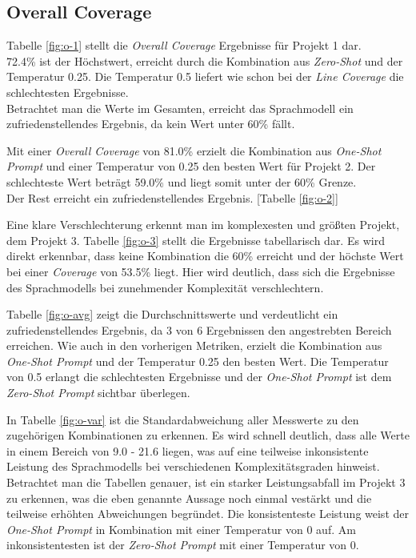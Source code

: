 \subsection{Overall Coverage}
Tabelle \ref{fig:o-1} stellt die \textit{Overall Coverage} Ergebnisse für Projekt 1 dar. \\72.4\% ist der Höchstwert, erreicht durch die Kombination aus \textit{Zero-Shot} und der Temperatur 0.25. Die Temperatur 0.5 liefert wie schon bei der \textit{Line Coverage}  die schlechtesten Ergebnisse.\\ Betrachtet man die Werte im Gesamten, erreicht das Sprachmodell ein zufriedenstellendes Ergebnis, da kein Wert unter 60\% fällt.

Mit einer \textit{Overall Coverage}  von 81.0\% erzielt die Kombination aus \textit{One-Shot Prompt} und einer Temperatur von 0.25 den besten Wert für Projekt 2. Der schlechteste Wert beträgt 59.0\% und liegt somit unter der 60\% Grenze.\\ Der Rest erreicht ein zufriedenstellendes Ergebnis. [Tabelle \ref{fig:o-2}]

Eine klare Verschlechterung erkennt man im komplexesten und größten Projekt, dem Projekt 3. Tabelle \ref{fig:o-3} stellt die Ergebnisse tabellarisch dar. Es wird direkt erkennbar, dass keine Kombination die 60\% erreicht und der höchste Wert bei einer \textit{Coverage} von 53.5\% liegt. Hier wird deutlich, dass sich die Ergebnisse des Sprachmodells bei zunehmender Komplexität verschlechtern.

Tabelle \ref{fig:o-avg} zeigt die Durchschnittswerte und verdeutlicht ein zufriedenstellendes Ergebnis, da 3 von 6 Ergebnissen den angestrebten Bereich erreichen. Wie auch in den vorherigen Metriken, erzielt die Kombination aus \textit{One-Shot Prompt} und der Temperatur 0.25 den besten Wert. Die Temperatur von 0.5 erlangt die schlechtesten Ergebnisse und der \textit{One-Shot Prompt} ist dem \textit{Zero-Shot Prompt} sichtbar überlegen.

In Tabelle \ref{fig:o-var} ist die Standardabweichung aller Messwerte zu den zugehörigen Kombinationen zu erkennen. Es wird schnell deutlich, dass alle Werte in einem Bereich von 9.0 - 21.6 liegen, was auf eine teilweise inkonsistente Leistung des Sprachmodells bei verschiedenen Komplexitätsgraden hinweist. Betrachtet man die Tabellen genauer, ist ein starker Leistungsabfall im Projekt 3 zu erkennen, was die eben genannte Aussage noch einmal vestärkt und die teilweise erhöhten Abweichungen begründet. Die konsistenteste Leistung weist der \textit{One-Shot Prompt} in Kombination mit einer Temperatur von 0 auf. Am inkonsistentesten ist der \textit{Zero-Shot Prompt} mit einer Temperatur von 0.


